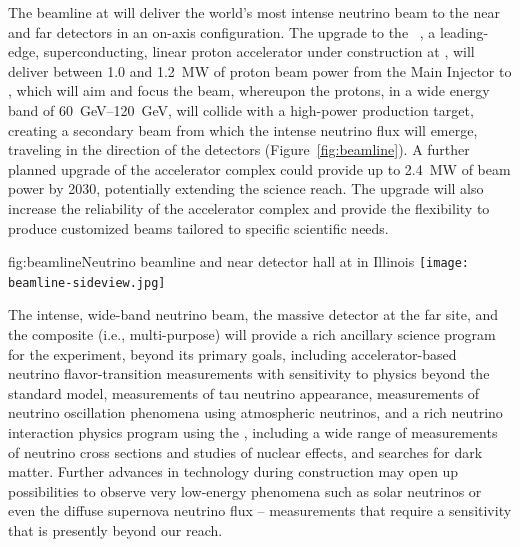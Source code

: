 The  %
beamline at  will deliver the world's most intense neutrino beam to the near and far detectors in an on-axis configuration. 
The upgrade to the  ~\cite{pip2-2013}, a leading-edge, superconducting, linear proton accelerator under construction at , will deliver between \num{1.0} and \SI{1.2}{MW} of proton beam power from the  Main Injector to , which will aim and focus the beam, whereupon the protons,  in a wide energy band of \SIrange{60}{120}{\GeV}, will collide with a high-power production target, creating a secondary beam from which the intense neutrino flux will emerge, traveling in the direction of the  detectors (Figure~\ref{fig:beamline}).   A further planned upgrade 
of the accelerator complex could provide up to \SI{2.4}{\MW} of beam power by 2030, 
potentially extending the  science reach. The upgrade will also increase the reliability of the  accelerator complex and provide the flexibility to produce customized  beams tailored to specific scientific needs.

\begin{dunefigure}{fig:beamline}{Neutrino beamline and  near detector hall at  in Illinois}
\texttt{[image: beamline-sideview.jpg]}
\end{dunefigure}

The intense, wide-band neutrino beam, the massive  detector at the far site, and the composite (i.e., multi-purpose) 
 will provide a rich ancillary science program for the  experiment, beyond its primary goals,   
including accelerator-based neutrino flavor-transition measurements with sensitivity to physics beyond the standard model, measurements of tau neutrino appearance, measurements of neutrino oscillation phenomena using atmospheric neutrinos, and  a rich neutrino interaction physics program using the  , including a wide range of measurements of neutrino cross sections and studies of nuclear effects, and searches for dark matter. 
Further advances in  
technology during   construction may open up possibilities to observe very low-energy phenomena such as solar neutrinos or even the diffuse supernova neutrino flux -- measurements that require a sensitivity that is presently beyond our reach.

